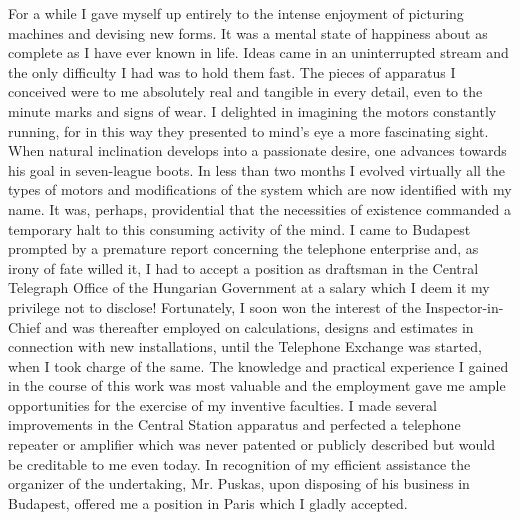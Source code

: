 \documentclass[a4paper,12pt,english,twoside,openright]{memoir}
\begin{document}




For a while I gave myself up entirely to the intense enjoyment of picturing machines and devising 
new forms.  It was a mental state of happiness about as complete as I have ever known in life.  
Ideas came in an uninterrupted stream and the only difficulty I had was to hold them fast.  The 
pieces of apparatus I conceived were to me absolutely real and tangible in every detail, even to 
the minute marks and signs of wear.  I delighted in imagining the motors constantly running, for in 
this way they presented to mind's eye a more fascinating sight.  When natural inclination 
develops into a passionate desire, one advances towards his goal in seven-league boots.  In less 
than two months I evolved virtually all the types of motors and modifications of the system which 
are now identified with my name.  It was, perhaps, providential that the necessities of existence 
commanded a temporary halt to this consuming activity of the mind.  I came to Budapest 
prompted by a premature report concerning the telephone enterprise and, as irony of fate willed 
it, I had to accept a position as draftsman in the Central Telegraph Office of the Hungarian 
Government at a salary which I deem it my privilege not to disclose! Fortunately, I soon won the 
interest of the Inspector-in-Chief and was thereafter employed on calculations, designs and 
estimates in connection with new installations, until the Telephone Exchange was started, when I 
took charge of the same.  The knowledge and practical experience I gained in the course of this 
work was most valuable and the employment gave me ample opportunities for the exercise of my 
inventive faculties.  I made several improvements in the Central Station apparatus and perfected 
a telephone repeater or amplifier which was never patented or publicly described but would be 
creditable to me even today.  In recognition of my efficient assistance the organizer of the 
undertaking, Mr. Puskas, upon disposing of his business in Budapest, offered me a position in 
Paris which I gladly accepted.  
\end{document}
